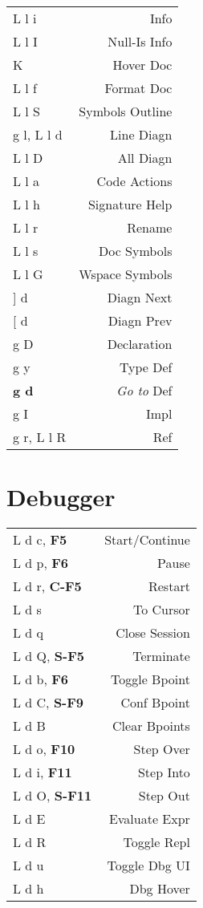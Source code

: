 \documentclass[
  ,landscape
  ,columns=4
]{cheatsheet}
\begin{document}
\begin{tabular}{lr}
	L l i        & Info               \\
	L l I        & Null-Is Info       \\
	K            & Hover Doc          \\
	L l f        & Format Doc         \\
	L l S        & Symbols Outline    \\
	g l, L l d   & Line Diagn         \\
	L l D        & All Diagn          \\
	L l a        & Code Actions       \\
	L l h        & Signature Help     \\
	L l r        & Rename             \\
	L l s        & Doc Symbols        \\
	L l G        & Wspace Symbols     \\
	{]} d        & Diagn Next         \\
	{[} d        & Diagn Prev         \\
	g D          & Declaration        \\
	g y          & Type Def           \\
	\textbf{g d} & \textit{Go to} Def \\
	g I          & Impl               \\
	g r, L l R   & Ref                \\
\end{tabular}

\section{Debugger}

\begin{tabular}{lr}
	L d c, \textbf{F5}    & Start/Continue \\
	L d p, \textbf{F6}    & Pause          \\
	L d r, \textbf{C-F5}  & Restart        \\
	L d s                 & To Cursor      \\
	L d q                 & Close Session  \\
	L d Q, \textbf{S-F5}  & Terminate      \\
	L d b, \textbf{F6}    & Toggle Bpoint  \\
	L d C, \textbf{S-F9}  & Conf Bpoint    \\
	L d B                 & Clear Bpoints  \\
	L d o, \textbf{F10}   & Step Over      \\
	L d i, \textbf{F11}   & Step Into      \\
	L d O, \textbf{S-F11} & Step Out       \\
	L d E                 & Evaluate Expr  \\
	L d R                 & Toggle Repl    \\
	L d u                 & Toggle Dbg UI  \\
	L d h                 & Dbg Hover      \\
\end{tabular}
\end{document}
